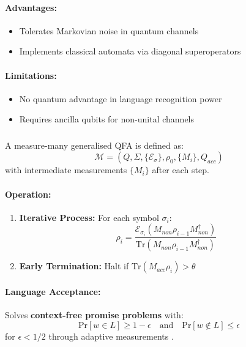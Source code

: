 \paragraph{Advantages:}
\begin{itemize}
    \item Tolerates Markovian noise in quantum channels
    \item Implements classical automata via diagonal superoperators
\end{itemize}

\paragraph{Limitations:}
\begin{itemize}
    \item No quantum advantage in language recognition power
    \item Requires ancilla qubits for non-unital channels
\end{itemize}

\subsubsection{}
\label{subsec:mm-1gqfa}

\begin{definition}
A measure-many generalised QFA is defined as:
\[
\mathcal{M} = (Q, \Sigma, \{\mathcal{E}_\sigma\}, \rho_0, \{M_i\}, Q_{acc})
\]
with intermediate measurements $\{M_i\}$ after each step.
\end{definition}

\paragraph{Operation:}
\begin{enumerate}
    \item \textbf{Iterative Process:} For each symbol $\sigma_i$:
    \[
    \rho_i = \frac{\mathcal{E}_{\sigma_i}(M_{non}\rho_{i-1}M_{non}^\dagger)}{\text{Tr}(M_{non}\rho_{i-1}M_{non}^\dagger)}
    \]
    \item \textbf{Early Termination:} Halt if $\text{Tr}(M_{acc}\rho_i) > \theta$
\end{enumerate}

\paragraph{Language Acceptance:}
Solves \textbf{context-free promise problems} with:
\[
\text{Pr}[w \in L] \geq 1-\epsilon \quad \text{and} \quad \text{Pr}[w \notin L] \leq \epsilon
\]
for $\epsilon < 1/2$ through adaptive measurements \cite{hirvensalo2012quantum}.

